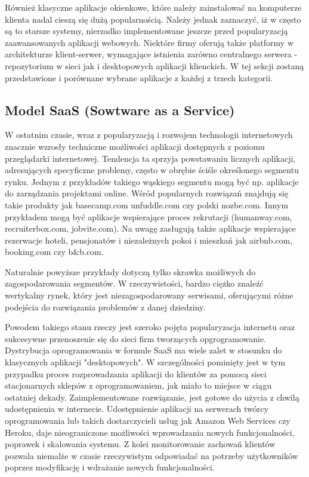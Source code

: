     Również klasyczne aplikacje okienkowe, które należy zainstalować na komputerze klienta nadal cieszą się dużą popularnością. Należy jednak zaznaczyć, iż w często są to starsze systemy, nierzadko implementowane jeszcze przed popularyzacją zaawansowanych aplikacji webowych. Niektóre firmy oferują także platformy w architekturze klient-serwer, wymagające istnienia zarówno centralnego serwera - repozytorium w sieci jak i desktopowych aplikacji klienckich. W tej sekcji zostaną przedstawione i porównane wybrane aplikacje z każdej z trzech kategorii. 

    \subsection{Model SaaS (Sowtware as a Service)}

      W ostatnim czasie, wraz z popularyzacją i rozwojem technologii internetowych znacznie wzrosły techniczne możliwości aplikacji dostępnych z poziomu przeglądarki internetowej. Tendencja ta sprzyja powstawaniu licznych aplikacji, adresujących specyficzne problemy, często w obrębie ściśle określonego segmentu rynku. Jednym z przykładów takiego wąskiego segmentu mogą być np. aplikacje do zarządzania projektami online. Wśród popularnych rozwiązań znajdują się takie produkty jak basecamp.com unfuddle.com czy polski nozbe.com. Innym przykładem mogą być aplikacje wspierające proces rekrutacji (humanway.com, recruiterbox.com, jobvite.com). Na uwagę zasługują także aplikacje wspierające rezerwacje hoteli, pensjonatów i niezależnych pokoi i mieszkań jak airbnb.com, booking.com czy b\&b.com. 

      Naturalnie powyższe przykłady dotyczą tylko skrawka możliwych do zagospodarowania segmentów. W rzeczywistości, bardzo ciężko znaleźć wertykalny rynek, który jest niezagospodarowany serwisami, oferującymi różne podejścia do rozwiązania problemów z danej dziedziny. 

      Powodem takiego stanu rzeczy jest szeroko pojęta popularyzacja internetu oraz sukcesywne przenoszenie się do sieci firm tworzących opgrogramowanie. Dystrybucja oprogramowania w formule SaaS ma wiele zalet w stosunku do klasycznych aplikacji "desktopowych". W szczególności pominięty jest w tym przypadku proces rozprowadzania aplikacji do klientów za pomocą sieci stacjonarnych sklepów z oprogramowaniem, jak miało to miejsce w ciągu ostatniej dekady. Zaimplementowane rozwiązanie, jest gotowe do użycia z chwilą udostępnienia w internecie. Udostępnienie aplikacji na serwerach twórcy oprogramowania lub takich dostarczycieli usług jak Amazon Web Services czy Heroku, daje nieograniczone możliwości wprowadzania nowych funkcjonalności, poprawek i skalowania systemu. Z kolei monitorowanie zachowań klientów pozwala niemalże w czasie rzeczywistym odpowiadać na potrzeby użytkowników poprzez modyfikację i wdrażanie nowych funkcjonalności. 

